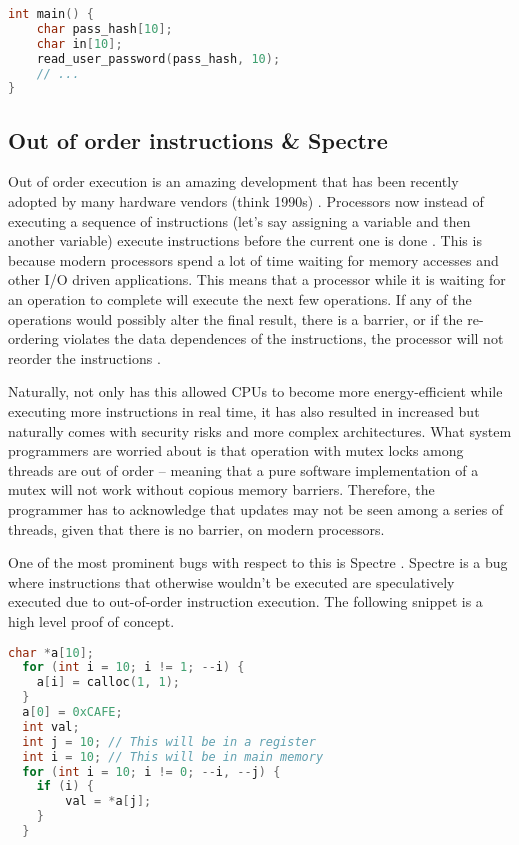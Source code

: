 \begin{lstlisting}[language=C]
int main() {
    char pass_hash[10];
    char in[10];
    read_user_password(pass_hash, 10);
    // ...
}
\end{lstlisting}

\subsection{Out of order instructions \& Spectre}

Out of order execution is an amazing development that has been recently adopted by many hardware vendors (think 1990s) .
Processors now instead of executing a sequence of instructions (let's say assigning a variable and then another variable) execute instructions before the current one is done \cite[P. 45]{guide2011intel}.
This is because modern processors spend a lot of time waiting for memory accesses and other I/O driven applications.
This means that a processor while it is waiting for an operation to complete will execute the next few operations.
If any of the operations would possibly alter the final result, there is a barrier, or if the re-ordering violates the data dependences of the instructions, the processor will not reorder the instructions \cite[P. 296]{guide2011intel}.

Naturally, not only has this allowed CPUs to become more energy-efficient while executing more instructions in real time, it has also resulted in increased but naturally comes with security risks and more complex architectures.
What system programmers are worried about is that operation with mutex locks among threads are out of order -- meaning that a pure software implementation of a mutex will not work without copious memory barriers.
Therefore, the programmer has to acknowledge that updates may not be seen among a series of threads, given that there is no barrier, on modern processors.

One of the most prominent bugs with respect to this is Spectre \cite{kocher2018spectre}.
Spectre is a bug where instructions that otherwise wouldn't be executed are speculatively executed due to out-of-order instruction execution.
The following snippet is a high level proof of concept.

\begin{lstlisting}[language=C]
  char *a[10];
  for (int i = 10; i != 1; --i) {
    a[i] = calloc(1, 1);
  }
  a[0] = 0xCAFE;
  int val;
  int j = 10; // This will be in a register
  int i = 10; // This will be in main memory
  for (int i = 10; i != 0; --i, --j) {
    if (i) {
        val = *a[j];
    }
  }
\end{lstlisting}

